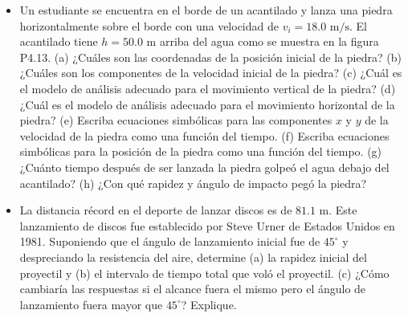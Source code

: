 \documentclass[11pt,a4paper]{article}
\begin{document}
\begin{itemize}
    \item[\textbf{13.}] Un estudiante se encuentra en el borde de un acantilado y lanza una piedra horizontalmente sobre el borde con una velocidad de $v_i = 18.0 \text{ m/s}$. El acantilado tiene $h = 50.0 \text{ m}$ arriba del agua como se muestra en la figura P4.13. (a) ¿Cuáles son las coordenadas de la posición inicial de la piedra? (b) ¿Cuáles son los componentes de la velocidad inicial de la piedra? (c) ¿Cuál es el modelo de análisis adecuado para el movimiento vertical de la piedra? (d) ¿Cuál es el modelo de análisis adecuado para el movimiento horizontal de la piedra? (e) Escriba ecuaciones simbólicas para las componentes $x$ y $y$ de la velocidad de la piedra como una función del tiempo. (f) Escriba ecuaciones simbólicas para la posición de la piedra como una función del tiempo. (g) ¿Cuánto tiempo después de ser lanzada la piedra golpeó el agua debajo del acantilado? (h) ¿Con qué rapidez y ángulo de impacto pegó la piedra?
    \vspace*{9cm}

    \item[\textbf{14.}] La distancia récord en el deporte de lanzar discos es de $81.1 \text{ m}$. Este lanzamiento de discos fue establecido por Steve Urner de Estados Unidos en 1981. Suponiendo que el ángulo de lanzamiento inicial fue de $45^\circ$ y despreciando la resistencia del aire, determine (a) la rapidez inicial del proyectil y (b) el intervalo de tiempo total que voló el proyectil. (c) ¿Cómo cambiaría las respuestas si el alcance fuera el mismo pero el ángulo de lanzamiento fuera mayor que $45^\circ$? Explique.
    \vspace*{6cm}
\end{itemize}

\newpage
\end{document}
